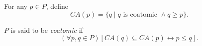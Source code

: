 For any $p \in P$, define
$$CA(p) = \{q \mid q \text{ is coatomic } \land q \geq p\}.$$

$P$ is said to be \emph{coatomic} if
$$(\forall p, q \in P)[CA(q) \subseteq CA(p) \leftrightarrow p \leq q].$$
